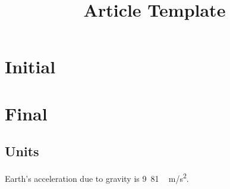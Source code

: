 \documentclass[11pt]{article}
\title{Article Template}
\author{}
\begin{document}

\maketitle

\section{Initial}

\lipsum[1-3]

\section{Final}

\lipsum[45]

\subsection{Units}

Earth's acceleration due to gravity is \unit{9.81\,m/s^{2}}.

\end{document}
